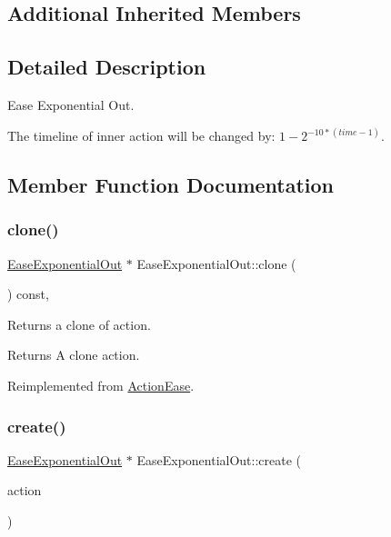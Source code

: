 \subsection*{Additional Inherited Members}


\subsection{Detailed Description}
Ease Exponential Out. 

The timeline of inner action will be changed by\+: $1-{ 2 }^{ -10*(time-1) }$. 

\subsection{Member Function Documentation}
\mbox{\label{classEaseExponentialOut_a484d36a99d2847cfa4f273d5ec73c209}} 
\subsubsection{\texorpdfstring{clone()}{clone()}}
{\footnotesize\ttfamily \hyperlink{classEaseExponentialOut}{Ease\+Exponential\+Out} $\ast$ Ease\+Exponential\+Out\+::clone (\begin{DoxyParamCaption}\item[{void}]{ }\end{DoxyParamCaption}) const\hspace{0.3cm}{\ttfamily [override]}, {\ttfamily [virtual]}}

Returns a clone of action.

\begin{DoxyReturn}{Returns}
A clone action. 
\end{DoxyReturn}


Reimplemented from \hyperlink{classActionEase_a39bec93fe161fb732a74d8e51a2fe08b}{Action\+Ease}.

\mbox{\label{classEaseExponentialOut_a358bb7b34b26a9424269912dff8e311b}} 
\subsubsection{\texorpdfstring{create()}{create()}}
{\footnotesize\ttfamily \hyperlink{classEaseExponentialOut}{Ease\+Exponential\+Out} $\ast$ Ease\+Exponential\+Out\+::create (\begin{DoxyParamCaption}\item[{\hyperlink{classActionInterval}{Action\+Interval} $\ast$}]{action }\end{DoxyParamCaption})\hspace{0.3cm}{\ttfamily [static]}}



